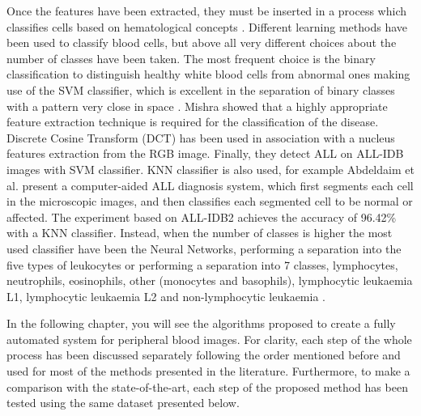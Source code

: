 \documentclass[final,a4paper,12pt,english]{UnicaPhdThesis3}
\begin{document}
Once the features have been extracted, they must be inserted in a process which classifies cells based on hematological concepts \cite{Biondi, Serbouti}. 
Different learning methods have been used to classify blood cells, but above all very different choices about the number of classes have been taken. The most frequent choice is the binary classification to distinguish healthy white blood cells from abnormal ones making use of the SVM classifier, which is excellent in the separation of binary classes with a pattern very close in space \cite{Mohapatra10a, Mohapatra10b, Mohapatra10c, Mohapatra14}. Mishra \cite{Mishra2017} showed that a highly appropriate feature extraction technique is required for the classification of the disease. Discrete Cosine Transform (DCT) has been used in association with a nucleus features extraction from the RGB image. Finally, they detect ALL on ALL-IDB images with SVM classifier.
KNN classifier is also used, for example Abdeldaim et al. \cite{Abdeldaim2018} present a computer-aided ALL diagnosis system, which first segments each cell in the microscopic images, and then classifies each segmented cell to be normal or affected. The experiment based on ALL-IDB2 achieves the
accuracy of 96.42\% with a KNN classifier. Instead, when the number of classes is higher the most used classifier have been the Neural Networks, performing a separation into the five types of leukocytes \cite{Sco06} or performing a separation into 7 classes, lymphocytes, neutrophils, eosinophils, other (monocytes and basophils), lymphocytic leukaemia L1, lymphocytic leukaemia L2 and non-lymphocytic leukaemia \cite{Buavirat}. 

In the following chapter, you will see the algorithms proposed to create a fully automated system for peripheral blood images. For clarity, each step of the whole process has been discussed separately following the order mentioned before and used for most of the methods presented in the literature. Furthermore, to make a comparison with the state-of-the-art, each step of the proposed method has been tested using the same dataset presented below.
\end{document}

